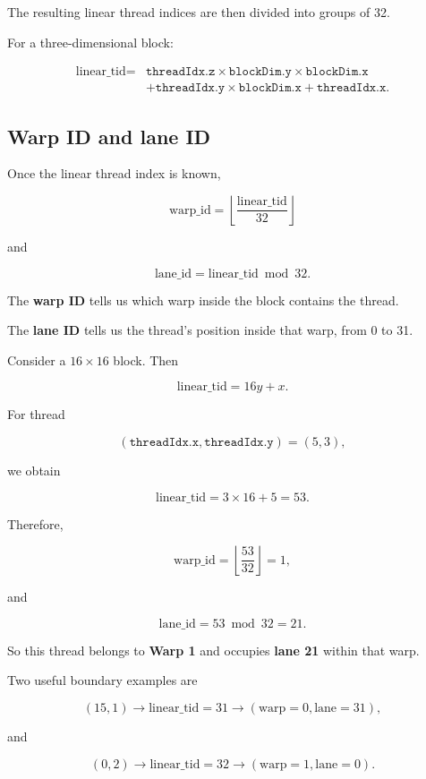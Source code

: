 \documentclass[11pt,a4paper]{article}
\begin{document}
The resulting linear thread indices are then divided into groups of 32.

For a three-dimensional block:

\[
\begin{aligned}
\text{linear\_tid}
={}&
\texttt{threadIdx.z}
\times
\texttt{blockDim.y}
\times
\texttt{blockDim.x}\\
&+
\texttt{threadIdx.y}
\times
\texttt{blockDim.x}
+
\texttt{threadIdx.x}.
\end{aligned}
\]

\subsection{Warp ID and lane ID}

Once the linear thread index is known,

\[
\boxed{
\text{warp\_id}
=
\left\lfloor
\frac{\text{linear\_tid}}{32}
\right\rfloor
}
\]

and

\[
\boxed{
\text{lane\_id}
=
\text{linear\_tid}\bmod 32.
}
\]

The \textbf{warp ID} tells us which warp inside the block contains the thread.

The \textbf{lane ID} tells us the thread's position inside that warp, from 0 to 31.

Consider a \(16\times16\) block. Then

\[
\text{linear\_tid}=16y+x.
\]

For thread

\[
(\texttt{threadIdx.x},\texttt{threadIdx.y})=(5,3),
\]

we obtain

\[
\text{linear\_tid}
=
3\times16+5
=
53.
\]

Therefore,

\[
\text{warp\_id}
=
\left\lfloor\frac{53}{32}\right\rfloor
=
1,
\]

and

\[
\text{lane\_id}
=
53\bmod32
=
21.
\]

So this thread belongs to \textbf{Warp 1} and occupies \textbf{lane 21} within that warp.

Two useful boundary examples are

\[
(15,1)
\rightarrow
\text{linear\_tid}=31
\rightarrow
(\text{warp}=0,\text{lane}=31),
\]

and

\[
(0,2)
\rightarrow
\text{linear\_tid}=32
\rightarrow
(\text{warp}=1,\text{lane}=0).
\]
\end{document}
